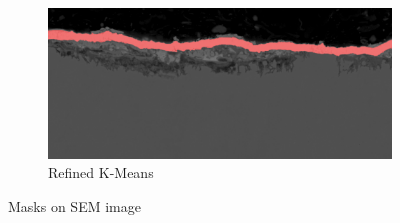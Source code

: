 \begin{figure}[ht]
\begin{subfigure}{0.3\textwidth}
        \centering
        \includegraphics[width=\linewidth]{PICTURES/MASK/149_original.png}
        \caption{Refined K-Means}
        \label{fig:kmean_refined_color}
    \end{subfigure}
    \caption{Masks on SEM image}
    \label{fig:three-masks_color}
\end{figure}

